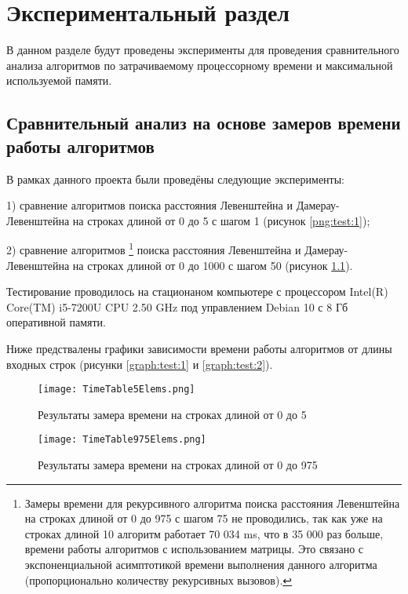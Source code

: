 \chapter{Экспериментальный раздел}
\label{cha:research}
    В данном разделе будут проведены эксперименты для проведения 
    сравнительного анализа алгоритмов по затрачиваемому процессорному 
    времени и максимальной используемой памяти.
    \section{Сравнительный анализ на основе замеров времени работы алгоритмов}
        В рамках данного проекта были проведёны следующие эксперименты:

        1) сравнение алгоритмов поиска расстояния Левенштейна и Дамерау-Левенштейна
        на строках длиной от 0 до 5 с шагом 1 (рисунок \ref{png:test:1});
        
        2) сравнение алгоритмов \footnote{Замеры времени для рекурсивного алгоритма поиска расстояния Левенштейна
        на строках длиной от 0 до 975 с шагом 75 не проводились, так как уже на
        строках длиной 10 алгоритм работает 70 034 ms, что в 35 000 раз больше, 
        времени работы алгоритмов с использованием матрицы. Это связано с экспоненциальной асимптотикой
        времени выполнения данного алгоритма (пропорционально количеству
        рекурсивных вызовов).} поиска расстояния Левенштейна и Дамерау-Левенштейна
        на строках длиной от 0 до 1000 с шагом 50 (рисунок \ref{png:test:2}).
        
        Тестирование проводилось на стационаном компьютере с процессором
        Intel(R) Core(TM) i5-7200U CPU 2.50 GHz
        под управлением Debian 10 с 8 Гб оперативной памяти.

        Ниже предствалены графики зависимости времени работы алгоритмов от длины входных строк
        (рисунки \ref{graph:test:1} и \ref{graph:test:2}).

        \begin{figure}[h!]
            \centering
            \texttt{[image: TimeTable5Elems.png]}
            \caption{Результаты замера времени на строках длиной от 0 до 5}
            \label{png:test:1}
        
            \texttt{[image: TimeTable975Elems.png]}
            \caption{Результаты замера времени на строках длиной от 0 до 975}
            \label{png:test:2}
        \end{figure}


